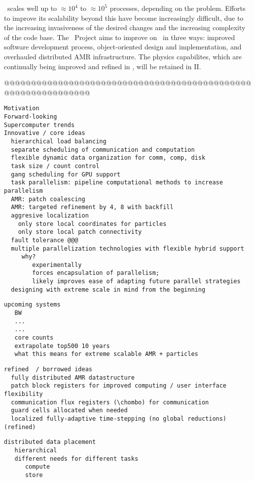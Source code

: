 \documentclass{article}
\begin{document}
\enzo\ scales well up to $\approx 10^4$ to $\approx 10^5$ processes,
depending on the problem.  Efforts to improve its scalability beyond
this have become increasingly difficult, due to the increasing
invasiveness of the desired changes and the increasing complexity of
the code base.  The \cello\ Project aims to improve on \enzo\ in three
ways: improved software development process, object-oriented design
and implementation, and overhauled distributed AMR infrastructure.
The physics capabilites, which are continually being improved and
refined in \enzo, will be retained in \enzo II.

@@@@@@@@@@@@@@@@@@@@@@@@@@@@@@@@@@@@@@@@@@@@@@@@@@@@@@@@@@@@@@ \ \\

\begin{verbatim}
Motivation
Forward-looking
Supercomputer trends
Innovative / core ideas
  hierarchical load balancing
  separate scheduling of communication and computation
  flexible dynamic data organization for comm, comp, disk
  task size / count control
  gang scheduling for GPU support
  task parallelism: pipeline computational methods to increase parallelism
  AMR: patch coalescing
  AMR: targeted refinement by 4, 8 with backfill
  aggresive localization
    only store local coordinates for particles
    only store local patch connectivity
  fault tolerance @@@
  multiple parallelization technologies with flexible hybrid support
     why?  
        experimentally 
        forces encapsulation of parallelism; 
        likely improves ease of adapting future parallel strategies
  designing with extreme scale in mind from the beginning
\end{verbatim}

\begin{verbatim}
upcoming systems
   BW
   ...
   ...
   core counts
   extrapolate top500 10 years
   what this means for extreme scalable AMR + particles
\end{verbatim}

\begin{verbatim}
refined  / borrowed ideas
  fully distributed AMR datastructure
  patch block registers for improved computing / user interface flexibility
  communication flux registers (\chombo) for communication
  guard cells allocated when needed
  localized fully-adaptive time-stepping (no global reductions) (refined)
\end{verbatim}



\begin{verbatim}
distributed data placement
   hierarchical
   different needs for different tasks
      compute
      store
\end{verbatim}
\end{document}
